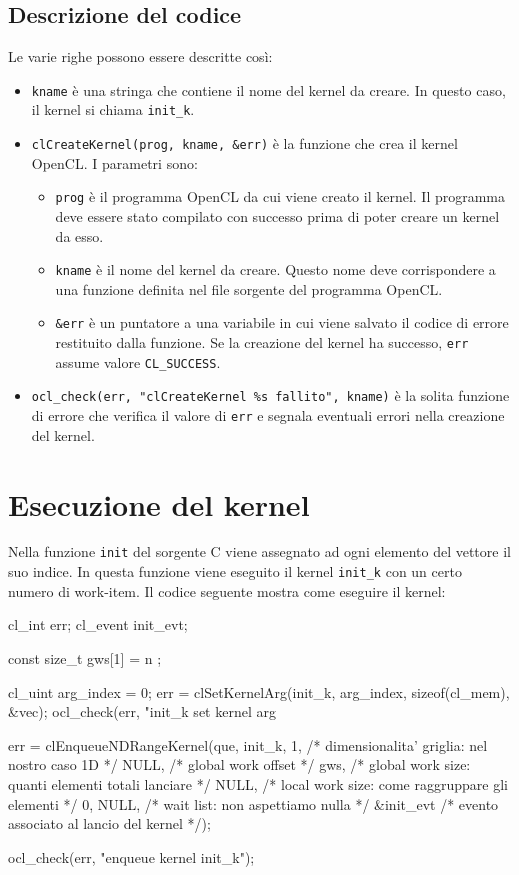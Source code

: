 \subsection*{Descrizione del codice}
Le varie righe possono essere descritte così:
\begin{itemize}
    \item \texttt{kname} è una stringa che contiene il nome del kernel da creare. In questo caso, il kernel si chiama \texttt{init\_k}.
    \item \texttt{clCreateKernel(prog, kname, \&err)} è la funzione che crea il kernel OpenCL. I parametri sono:
    \begin{itemize}
        \item \texttt{prog} è il programma OpenCL da cui viene creato il kernel. Il programma deve essere stato compilato con successo prima di poter creare un kernel da esso.
        \item \texttt{kname} è il nome del kernel da creare. Questo nome deve corrispondere a una funzione definita nel file sorgente del programma OpenCL.
        \item \texttt{\&err} è un puntatore a una variabile in cui viene salvato il codice di errore restituito dalla funzione. Se la creazione del kernel ha successo, \texttt{err} assume valore \texttt{CL\_SUCCESS}.
    \end{itemize}
    \item \texttt{ocl\_check(err, "clCreateKernel \%s fallito", kname)} è la solita funzione di errore che verifica il valore di \texttt{err} e segnala eventuali errori nella creazione del kernel.
\end{itemize}

\section{Esecuzione del kernel}\label{sec:opencl_basi_execution}
Nella funzione \texttt{init} del sorgente C viene assegnato ad ogni elemento del vettore il suo indice. In questa funzione viene eseguito il kernel \texttt{init\_k} con un certo numero di work-item. Il codice seguente mostra come eseguire il kernel:
\begin{code}[caption={Esecuzione di un kernel OpenCL}, label={code:opencl_basi_execution}]
  cl_int err;
  cl_event init_evt;

  const size_t gws[1] = { n };

  cl_uint arg_index = 0;
  err = clSetKernelArg(init_k, arg_index, sizeof(cl_mem), &vec);
  ocl_check(err, "init_k set kernel arg %

  err = clEnqueueNDRangeKernel(que, init_k,
    1,    /* dimensionalita' griglia: nel nostro caso 1D */
    NULL, /* global work offset */
    gws,  /* global work size: quanti elementi totali lanciare */
    NULL, /* local work size: come raggruppare gli elementi */
    0, NULL, /* wait list: non aspettiamo nulla */
    &init_evt /* evento associato al lancio del kernel */);

  ocl_check(err, "enqueue kernel init_k");
\end{code}

